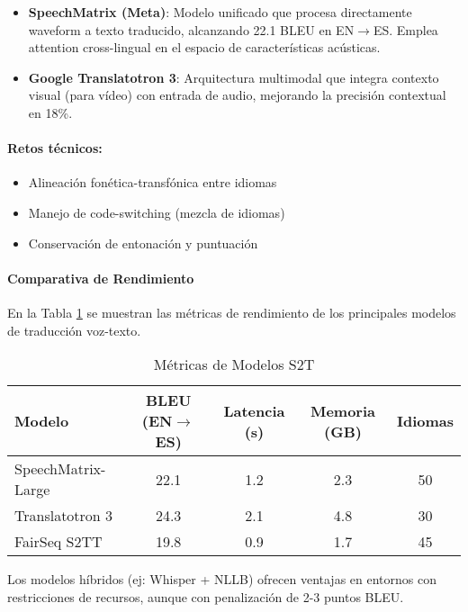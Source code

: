 \begin{itemize}
    \item \textbf{SpeechMatrix (Meta)}: Modelo unificado que procesa directamente waveform a texto traducido, alcanzando 22.1 BLEU en EN$\rightarrow$ES\cite{zhou2024preservingspeakerinformationdirect}. Emplea attention cross-lingual en el espacio de características acústicas.
    \item \textbf{Google Translatotron 3}: Arquitectura multimodal que integra contexto visual (para vídeo) con entrada de audio, mejorando la precisión contextual en 18\%\cite{jia2022cvss}.
\end{itemize}

\paragraph{Retos técnicos:}
\begin{itemize}
    \item Alineación fonética-transfónica entre idiomas
    \item Manejo de code-switching (mezcla de idiomas)
    \item Conservación de entonación y puntuación
\end{itemize}

\paragraph{Comparativa de Rendimiento}
En la Tabla \ref{tab:s2t-metrics} se muestran las métricas de rendimiento de los principales modelos de traducción voz-texto.

\begin{table}[h]
    \centering
    \caption{Métricas de Modelos S2T}
    \label{tab:s2t-metrics}
    \begin{tabular}{|l|c|c|c|c|}
        \hline
        \textbf{Modelo} & \textbf{BLEU (EN$\rightarrow$ES)} & \textbf{Latencia (s)} & \textbf{Memoria (GB)} & \textbf{Idiomas} \\
        \hline
        SpeechMatrix-Large & 22.1 & 1.2 & 2.3 & 50 \\
        \hline
        Translatotron 3 & 24.3 & 2.1 & 4.8 & 30 \\
        \hline
        FairSeq S2TT & 19.8 & 0.9 & 1.7 & 45 \\
        \hline
    \end{tabular}
\end{table}

Los modelos híbridos (ej: Whisper + NLLB) ofrecen ventajas en entornos con restricciones de recursos, aunque con penalización de 2-3 puntos BLEU\cite{jia2022translatotron2highqualitydirect}.

